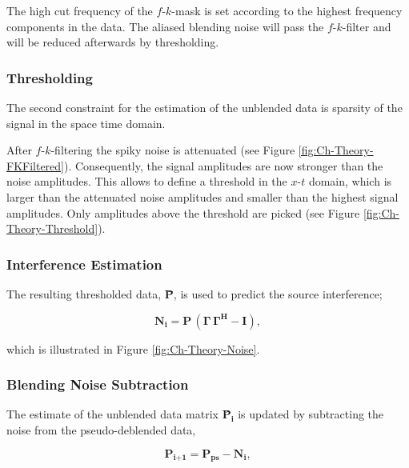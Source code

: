 The high cut frequency of the $f$-$k$-mask is set according to the highest frequency components in the data. The aliased blending noise will pass the $f$-$k$-filter and will be reduced afterwards by thresholding. 


\subsubsection*{Thresholding}

The second constraint for the estimation of the unblended data is sparsity of the signal in the space time domain.

After $f$-$k$-filtering the spiky noise is attenuated (see Figure \ref{fig:Ch-Theory-FKFiltered}). Consequently, the signal amplitudes are now stronger than the noise amplitudes. This allows to define a threshold in the $x$-$t$ domain, which is larger than the attenuated noise amplitudes and smaller than the highest signal amplitudes. Only amplitudes above the threshold are picked (see Figure \ref{fig:Ch-Theory-Threshold}). 

\subsubsection*{Interference Estimation}

The resulting thresholded data, \textbf{\={P}}, is used to predict the source interference;

\begin{equation}
	\textbf{\^{N}}_\textbf{i} = \textbf{\={P}} \, (\mathbf{\Gamma \, \Gamma^H} - \textbf{I}),
	\label{eq:Ch-Theory-NoiseEstimation}
\end{equation}

which is illustrated in Figure \ref{fig:Ch-Theory-Noise}.
 


\subsubsection*{Blending Noise Subtraction} 

The estimate of the unblended data matrix \textbf{\^{P}}$_\textbf{i}$ is updated by subtracting the noise from the pseudo-deblended data,

\begin{equation}
	\textbf{\^P}_\textbf{i+1} = \textbf{P}_\textbf{ps} - \textbf{\^{N}}_\textbf{i}, 
	\label{eq:Ch-Theory-DataUpdate1}
\end{equation}

